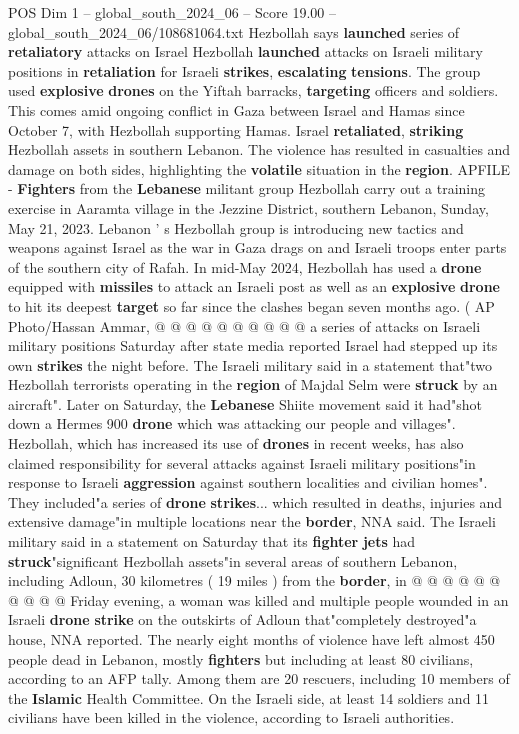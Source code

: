 \begin{textsample}{POS Dim 1 – global\_south\_2024\_06 – Score 19.00 – global\_south\_2024\_06/108681064.txt}  \label{ex:f1_pos_138}
Hezbollah says \textbf{launched} series of \textbf{retaliatory} attacks on Israel Hezbollah \textbf{launched} attacks on Israeli military positions in \textbf{retaliation} for Israeli \textbf{strikes}, \textbf{escalating} \textbf{tensions}.
The group used \textbf{explosive} \textbf{drones} on the Yiftah barracks, \textbf{targeting} officers and soldiers.
This comes amid ongoing conflict in Gaza between Israel and Hamas since October 7, with Hezbollah supporting Hamas.
Israel \textbf{retaliated}, \textbf{striking} Hezbollah assets in southern Lebanon.
The violence has resulted in casualties and damage on both sides, highlighting the \textbf{volatile} situation in the \textbf{region}.
APFILE - \textbf{Fighters} from the \textbf{Lebanese} militant group Hezbollah carry out a training exercise in Aaramta village in the Jezzine District, southern Lebanon, Sunday, May 21, 2023.
Lebanon ' s Hezbollah group is introducing new tactics and weapons against Israel as the war in Gaza drags on and Israeli troops enter parts of the southern city of Rafah.
In mid-May 2024, Hezbollah has used a \textbf{drone} equipped with \textbf{missiles} to attack an Israeli post as well as an \textbf{explosive} \textbf{drone} to hit its deepest \textbf{target} so far since the clashes began seven months ago. ( AP Photo/Hassan Ammar, @ @ @ @ @ @ @ @ @ @ a series of attacks on Israeli military positions Saturday after state media reported Israel had stepped up its own \textbf{strikes} the night before.
The Israeli military said in a statement that"two Hezbollah terrorists operating in the \textbf{region} of Majdal Selm were \textbf{struck} by an aircraft".
Later on Saturday, the \textbf{Lebanese} Shiite movement said it had"shot down a Hermes 900 \textbf{drone} which was attacking our people and villages".
Hezbollah, which has increased its use of \textbf{drones} in recent weeks, has also claimed responsibility for several attacks against Israeli military positions"in response to Israeli \textbf{aggression} against southern localities and civilian homes".
They included"a series of \textbf{drone} \textbf{strikes}... which resulted in deaths, injuries and extensive damage"in multiple locations near the \textbf{border}, NNA said.
The Israeli military said in a statement on Saturday that its \textbf{fighter} \textbf{jets} had \textbf{struck}"significant Hezbollah assets"in several areas of southern Lebanon, including Adloun, 30 kilometres ( 19 miles ) from the \textbf{border}, in @ @ @ @ @ @ @ @ @ @ Friday evening, a woman was killed and multiple people wounded in an Israeli \textbf{drone} \textbf{strike} on the outskirts of Adloun that"completely destroyed"a house, NNA reported.
The nearly eight months of violence have left almost 450 people dead in Lebanon, mostly \textbf{fighters} but including at least 80 civilians, according to an AFP tally.
Among them are 20 rescuers, including 10 members of the \textbf{Islamic} Health Committee.
On the Israeli side, at least 14 soldiers and 11 civilians have been killed in the violence, according to Israeli authorities.


\end{textsample}
